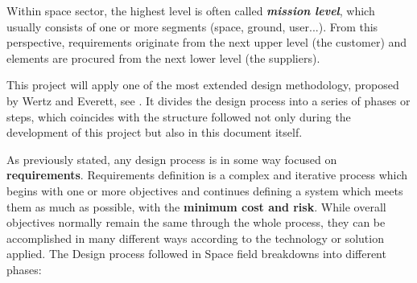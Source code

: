 Within space sector, the highest level is often called \textbf{\textit{mission level}}, which usually consists of one or more segments (space, ground, user...). From this perspective, requirements originate from the next upper level (the customer) and elements are procured from the next lower level (the suppliers).

This project will apply one of the most extended design methodology, proposed by Wertz and Everett, see \cite{smad}. It divides the design process into a series of phases or steps, which coincides with the structure followed not only during the development of this project but also in this document itself.

As previously stated, any design process is in some way focused on \textbf{requirements}. Requirements definition is a complex and iterative process which begins with one or more objectives and continues defining a system which meets them as much as possible, with the \textbf{minimum cost and risk}. While overall objectives normally remain the same through the whole process, they can be accomplished in many different ways according to the technology or solution applied. The Design process followed in Space field breakdowns into different phases:

